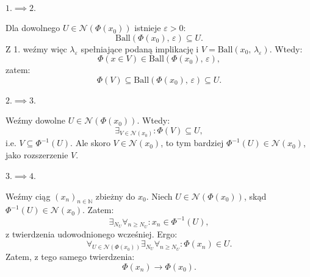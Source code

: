 \documentclass{article}
\numberwithin{defi}{section}
\numberwithin{defi}{section}
\newcommand{\N}{\mathbb{N}}
\newcommand{\Nau}{\mathcal{N}}
\providecommand{\eps}{\varepsilon}
\newcommand{\ciag}[1]{(#1_{n})_{n \in \N}}
\newcommand{\ball}[2]{\text{Ball}(#1, \, #2)}
\begin{document}
\begin{dow}
    \paragraph{$1. \implies 2.$}
    Dla dowolnego $U \in \Nau(\Phi(x_0))$ istnieje $\eps > 0$: \begin{equation*}
        \ball{\Phi(x_0)}{\eps} \subseteq U.
    \end{equation*} Z 1. weźmy więc $\lambda_\eps$ spełniające podaną implikację i $V = \ball{x_0}{\lambda_\eps}$. Wtedy: \begin{equation*}
        \Phi( x \in V) \in \ball{\Phi(x_0)}{\eps},
    \end{equation*} zatem: \begin{equation*}
        \Phi(V) \subseteq \ball{\Phi(x_0)}{\eps} \subseteq U.
    \end{equation*}

    \paragraph{$2. \implies 3.$}
    Weźmy dowolne $U \in \Nau(\Phi(x_0))$. Wtedy: \begin{equation*}
        \exists_{V \in \Nau(x_0)}: \Phi(V) \subseteq U,
    \end{equation*} i.e. $V \subseteq \Phi^{-1}(U)$. Ale skoro $V \in \Nau(x_0)$, to tym bardziej $\Phi^{-1}(U) \in \Nau(x_0)$, jako rozszerzenie $V$.

    \paragraph{$3. \implies 4.$}
    Weźmy ciąg $\ciag{x}$ zbieżny do $x_0$. Niech $U \in \Nau(\Phi(x_0))$, skąd $\Phi^{-1}(U) \in \Nau(x_0)$. Zatem: \begin{equation*}
        \exists_{N_U} \forall_{n \geqslant N_U}: x_n \in \Phi^{-1}(U),
    \end{equation*} z twierdzenia udowodnionego wcześniej. %
    Ergo: \begin{equation*}
        \forall_{U \in \Nau(\Phi(x_0))} \exists_{N_U} \forall_{n \geqslant N_U}: \Phi(x_n) \in U.
    \end{equation*} Zatem, z tego samego twierdzenia: \begin{equation*}
        \Phi(x_n) \to \Phi(x_0).
    \end{equation*}


\end{dow}
\end{document}
